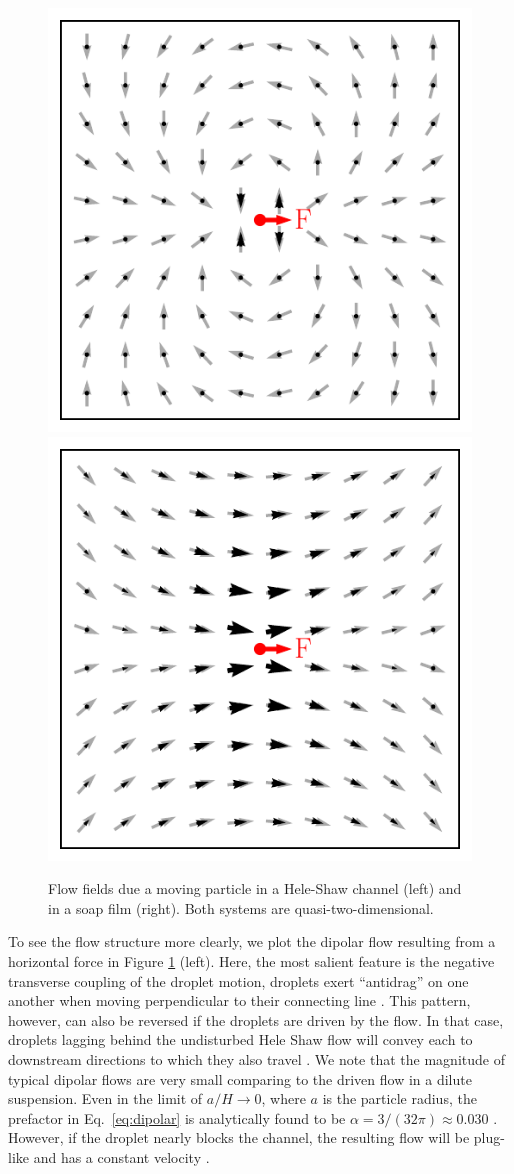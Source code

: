 \begin{figure}%
  \centering
  \includegraphics[width=0.49\columnwidth]{dipolar.pdf}
  \includegraphics[width=0.49\columnwidth]{soap.pdf}
  \caption{Flow fields due a moving particle in a Hele-Shaw channel (left) and in a soap film (right). Both systems are quasi-two-dimensional.}
  \label{fig:q2d}
\end{figure}

To see the flow structure more clearly, we plot the dipolar flow resulting from a horizontal force in Figure \ref{fig:q2d} (left).
Here, the most salient feature is the negative transverse coupling of the droplet motion, \ie droplets exert ``antidrag'' on one another when moving perpendicular to their connecting line \citep{Cui2004}.
This pattern, however, can also be reversed if the droplets are driven by the flow. In that case, droplets lagging behind the undisturbed Hele Shaw flow will convey each to downstream directions to which they also travel \citep{Beatus2006}.
We note that the magnitude of typical dipolar flows are very small comparing to the driven flow in a dilute suspension. Even in the limit of $a/H \to 0$, where $a$ is the particle radius, the prefactor in Eq.\ \eqref{eq:dipolar} is analytically found to be $\alpha=3/(32\pi)\approx 0.030$ \citep{LironMochon}.
However, if the droplet nearly blocks the channel, the resulting flow will be plug-like and has a constant velocity \citep{q2d_Beatus}.


